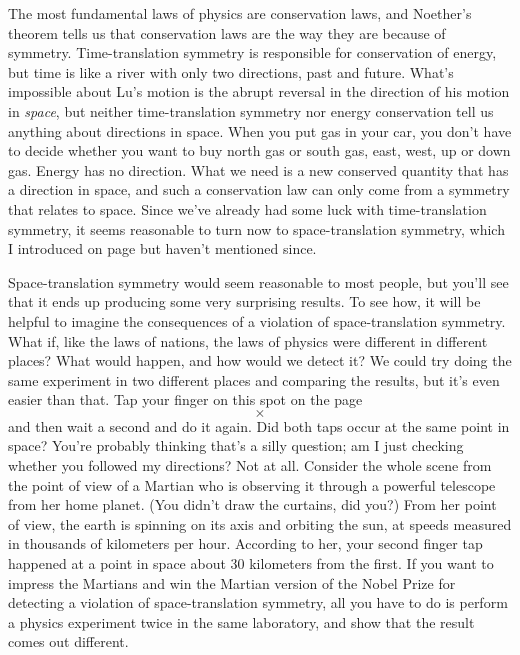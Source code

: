 The most fundamental laws of physics are conservation laws, and Noether's theorem
tells us that conservation laws are the way they are because of symmetry. Time-translation
symmetry is responsible for conservation of energy, but time is like a
river with only two directions, past and future. What's impossible about Lu's
motion is the abrupt reversal in the direction of his motion in \emph{space}, but neither
time-translation symmetry nor energy conservation tell us anything about directions
in space. When you put gas in your car, you don't have to decide whether you want to
buy north gas or south gas, east, west, up or down gas. Energy has no direction. What
we need is a new conserved quantity that has a direction in space, and such a
conservation law can only come from a symmetry that relates to space. Since we've already
had some luck with time-translation symmetry, it seems reasonable to turn now to
space-translation symmetry, which I introduced on page
\pageref{space-translation-symmetry} but haven't mentioned since.

\label{points-in-space-have-no-identity}
Space-translation symmetry would seem reasonable to most people, but you'll see that it
ends up producing some very surprising results. To see how, it will be
helpful to imagine the consequences of a violation of space-translation symmetry.
What if, like the laws of nations, the laws of physics were different in different
places? What would happen, and how would we detect it? We could try doing the
same experiment in two different places and comparing the results, but it's
even easier than that. Tap your finger on this spot on the page
\begin{equation*}
	\times
\end{equation*}
and then wait a second and do it again. Did both taps occur at the same point in space?
You're probably thinking that's a silly question; am I just checking whether you followed
my directions? Not at all. Consider the whole scene from the point of view of a Martian
who is observing it through a powerful telescope from her home planet. (You didn't
draw the curtains, did you?) From her point of view, the earth is spinning
on its axis and orbiting the sun, at speeds measured in thousands of kilometers per hour.
According to her, your second finger tap happened at a point in space about
30 kilometers from the first. If you want to impress the Martians and win the Martian version of
the Nobel Prize for detecting a violation of space-translation symmetry,
all you have to do is perform a physics experiment twice in the same laboratory, and
show that the result comes out different.

